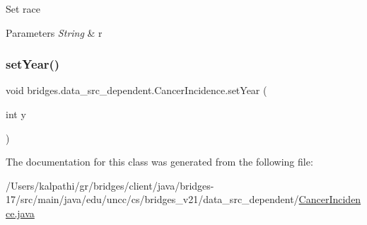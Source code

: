 Set race


\begin{DoxyParams}{Parameters}
{\em String} & r \\
\hline
\end{DoxyParams}
\mbox{\label{classbridges_1_1data__src__dependent_1_1_cancer_incidence_aa5524736b76d67f1248d1a05d9f596a9}} 
\subsubsection{\texorpdfstring{set\+Year()}{setYear()}}
{\footnotesize\ttfamily void bridges.\+data\+\_\+src\+\_\+dependent.\+Cancer\+Incidence.\+set\+Year (\begin{DoxyParamCaption}\item[{int}]{y }\end{DoxyParamCaption})}



The documentation for this class was generated from the following file\+:\begin{DoxyCompactItemize}
\item 
/\+Users/kalpathi/gr/bridges/client/java/bridges-\/17/src/main/java/edu/uncc/cs/bridges\+\_\+v21/data\+\_\+src\+\_\+dependent/\mbox{\hyperlink{_cancer_incidence_8java}{Cancer\+Incidence.\+java}}\end{DoxyCompactItemize}
